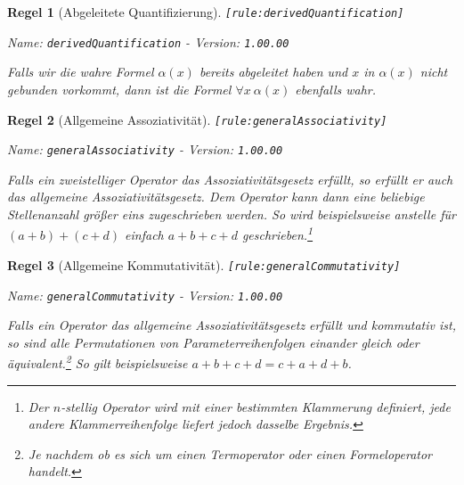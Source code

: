 \documentclass[a4paper,german,10pt,twoside]{book}
\newtheorem{rul}{Regel}
\theoremstyle{definition}
\theoremstyle{remark}
\begin{document}
\begin{rul}[Abgeleitete Quantifizierung]
\label{rule:derivedQuantification} \hypertarget{rule:derivedQuantification}{}
{\tt \tiny [\verb]rule:derivedQuantification]]}

\par
{\em   Name: \verb]derivedQuantification]  -  Version: \verb]1.00.00]}


Falls wir die wahre Formel $\alpha(x)$ bereits abgeleitet haben und $x$ in $\alpha(x)$ nicht gebunden vorkommt, dann ist die Formel $\forall x \ \alpha(x)$ ebenfalls wahr.
\end{rul}


\begin{rul}[Allgemeine Assoziativit{\"a}t]
\label{rule:generalAssociativity} \hypertarget{rule:generalAssociativity}{}
{\tt \tiny [\verb]rule:generalAssociativity]]}

\par
{\em   Name: \verb]generalAssociativity]  -  Version: \verb]1.00.00]}


Falls ein zweistelliger Operator das Assoziativit{\"a}tsgesetz erf{\"u}llt, so erf{\"u}llt er auch das allgemeine Assoziativit{\"a}tsgesetz. Dem Operator kann dann eine beliebige Stellenanzahl gr{\"o}{\ss}er eins zugeschrieben werden. So wird beispielsweise anstelle f{\"u}r $(a + b) + (c + d)$ einfach $a + b + c + d$ geschrieben.\footnote{Der $n$-stellig Operator wird mit einer bestimmten Klammerung definiert, jede andere Klammerreihenfolge liefert jedoch dasselbe Ergebnis.}
\end{rul}


\begin{rul}[Allgemeine Kommutativit{\"a}t]
\label{rule:generalCommutativity} \hypertarget{rule:generalCommutativity}{}
{\tt \tiny [\verb]rule:generalCommutativity]]}

\par
{\em   Name: \verb]generalCommutativity]  -  Version: \verb]1.00.00]}


Falls ein Operator das allgemeine Assoziativit{\"a}tsgesetz erf{\"u}llt und kommutativ ist, so sind alle Permutationen von Parameterreihenfolgen einander gleich oder {\"a}quivalent.\footnote{Je nachdem ob es sich um einen Termoperator oder einen Formeloperator handelt.} So gilt beispielsweise $a + b + c + d  = c + a + d + b$.
\end{rul}
\end{document}
